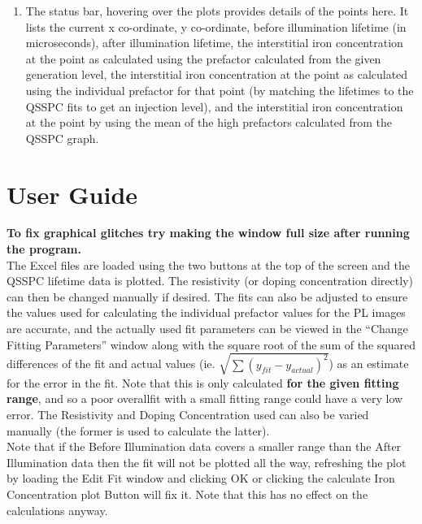 \documentclass[final,a4paper,oneside,12pt]{article}
\begin{document}
\begin{enumerate}
\item The status bar, hovering over the plots provides details of the points here. It lists the current x co-ordinate, y co-ordinate, before illumination lifetime (in microseconds), after illumination lifetime, the interstitial iron concentration at the point as calculated using the prefactor calculated from the given generation level, the interstitial iron concentration at the point as calculated using the individual prefactor for that point (by matching the lifetimes to the QSSPC fits to get an injection level), and the interstitial iron concentration at the point by using the mean of the high prefactors calculated from the QSSPC graph.
\end{enumerate}


\section{User Guide}
{\bf To fix graphical glitches try making the window full size after running the program.}\\
The Excel files are loaded using the two buttons at the top of the screen and the QSSPC lifetime data is plotted. The resistivity (or doping concentration directly) can then be changed manually if desired. The fits can also be adjusted to ensure the values used for calculating the individual prefactor values for the PL images are accurate, and the actually used fit parameters can be viewed in the ``Change Fitting Parameters'' window along with the square root of the sum of the squared differences of the fit and actual values (ie. $\sqrt{\sum (y_{fit} - y_{actual})^{2}}$) as an estimate for the error in the fit. Note that this is only calculated {\bf for the given fitting range}, and so a poor overallfit with a small fitting range could have a very low error. The Resistivity and Doping Concentration used can also be varied manually (the former is used to calculate the latter).\\

Note that if the Before Illumination data covers a smaller range than the After Illumination data then the fit will not be plotted all the way, refreshing the plot by loading the Edit Fit window and clicking OK or clicking the calculate Iron Concentration plot Button will fix it. Note that this has no effect on the calculations anyway.\\
\end{document}
